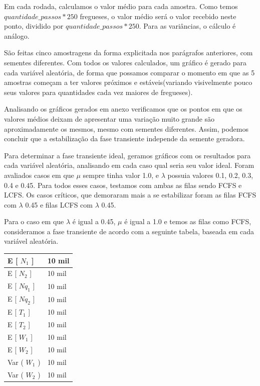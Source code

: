 \documentclass[a4paper,10pt]{article}
\begin{document}
    Em cada rodada, calculamos o valor médio para cada amostra. Como temos $quantidade\_passos * 250$ fregueses, o valor médio será o valor recebido neste ponto, dividido por $quantidade\_passos * 250$. Para as variâncias, o cálculo é análogo.

    São feitas cinco amostragens da forma explicitada nos parágrafos anteriores, com sementes diferentes. Com todos os valores calculados, um gráfico é gerado para cada variável aleatória, de forma que possamos comparar o momento em que as 5 amostras começam a ter valores próximos e estáveis(variando visivelmente pouco seus valores para quantidades cada vez maiores de fregueses).

    Analisando os gráficos gerados em anexo verificamos que os pontos em que os valores médios deixam de apresentar uma variação muito grande são aproximadamente os mesmos, mesmo com sementes diferentes. Assim, podemos concluir que a estabilização da fase transiente independe da semente geradora.

    Para determinar a fase transiente ideal, geramos gráficos com os resultados para cada variável aleatória, analisando em cada caso qual seria seu valor ideal. Foram avaliados casos em que $\mu$ sempre tinha valor 1.0, e $\lambda$ possuia valores 0.1, 0.2, 0.3, 0.4 e 0.45. Para todos esses casos, testamos com ambas as filas sendo FCFS e LCFS. Os casos críticos, que demoraram mais a se estabilizar foram as filas FCFS com $\lambda$ 0.45 e filas LCFS com $\lambda$ 0.45.

    Para o caso em que $\lambda$ é igual a 0.45, $\mu$ é igual a 1.0 e temos as filas como FCFS, consideramos a fase transiente de acordo com a seguinte tabela, baseada em cada variável aleatória.

\begin{center}
\begin{tabular} { | l | l | }
    \hline
    E [ $N_1$ ]  & 10 mil \\ \hline
    E [ $N_2$ ] & 10 mil \\ \hline
    E [ $Nq_1$ ] & 10 mil \\ \hline
    E [ $Nq_2$ ]	& 10 mil \\ \hline
    E [ $T_1$ ] & 10 mil \\ \hline
    E [ $T_2$ ] & 10 mil \\ \hline
    E [ $W_1$ ] & 10 mil \\ \hline
    E [ $W_2$ ] & 10 mil \\ \hline
    Var ( $W_1$ ) & 10 mil \\ \hline
    Var ( $W_2$ ) & 10 mil \\ \hline
\end{tabular}
\end{center}
\end{document}
